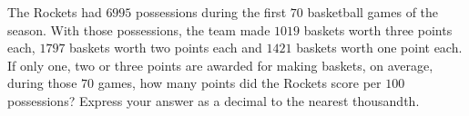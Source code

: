 The Rockets had $6995$ possessions during the first $70$ basketball games of the season. With those possessions, the team made $1019$ baskets worth three points each, $1797$ baskets worth two points each and $1421$ baskets worth one point each. If only one, two or three points are awarded for making baskets, on average, during those $70$ games, how many points did the Rockets score per $100$ possessions? Express your answer as a decimal to the nearest thousandth.
